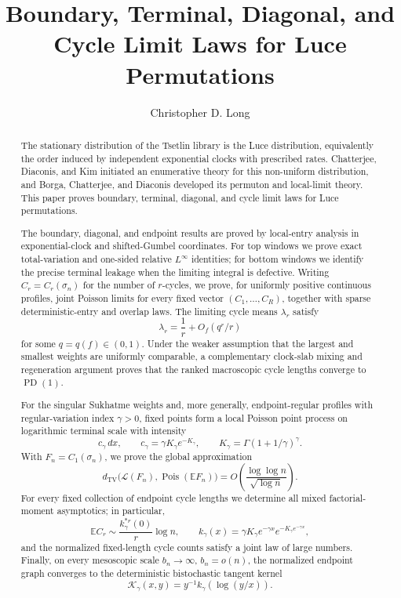 \documentclass[11pt]{article}
\title{Boundary, Terminal, Diagonal, and Cycle Limit Laws for Luce Permutations}
\author{Christopher D. Long}
\date{}
\theoremstyle{remark}
\newcommand{\Ee}{\mathbb E}
\newcommand{\dd}{\,d}
\begin{document}
\maketitle

\begin{abstract}
The stationary distribution of the Tsetlin library is the Luce distribution,
equivalently the order induced by independent exponential clocks with prescribed
rates.  Chatterjee, Diaconis, and Kim initiated an enumerative theory for this
non-uniform distribution, and Borga, Chatterjee, and Diaconis developed its
permuton and local-limit theory.  This paper proves boundary, terminal,
diagonal, and cycle limit laws for Luce permutations.

The boundary, diagonal, and endpoint results are proved by local-entry analysis
in exponential-clock and shifted-Gumbel coordinates.  For top windows we prove
exact total-variation and one-sided relative $L^\infty$ identities; for bottom
windows we identify the precise terminal leakage when the limiting integral is
defective.  Writing $C_r=C_r(\sigma_n)$ for the number of $r$-cycles, we prove,
for uniformly positive continuous profiles, joint Poisson limits for every
fixed vector $(C_1,\ldots,C_R)$, together with sparse deterministic-entry and
overlap laws.  The limiting cycle means $\lambda_r$ satisfy
\[
        \lambda_r=\frac1r+O_f(q^r/r)
\]
for some $q=q(f)\in(0,1)$.  Under the weaker assumption that the largest and
smallest weights are uniformly comparable, a complementary clock-slab mixing
and regeneration argument proves that the ranked macroscopic cycle lengths
converge to $\operatorname{PD}(1)$.

For the singular Sukhatme weights and, more generally, endpoint-regular profiles
with regular-variation index $\gamma>0$, fixed points form a local Poisson point
process on logarithmic terminal scale with intensity
\[
        c_\gamma\dd x,
        \qquad
        c_\gamma=\gamma K_\gamma e^{-K_\gamma},
        \qquad
        K_\gamma=\Gamma(1+1/\gamma)^\gamma.
\]
With $F_n=C_1(\sigma_n)$, we prove the global approximation
\[
        d_{\mathrm{TV}}\bigl(\mathcal L(F_n),
        \operatorname{Pois}(\Ee F_n)\bigr)
        =O\!\left(\frac{\log\log n}{\sqrt{\log n}}\right).
\]
For every fixed collection of endpoint cycle lengths we determine all mixed
factorial-moment asymptotics; in particular,
\[
        \Ee C_r\sim \frac{k_\gamma^{*r}(0)}r\log n,
        \qquad
        k_\gamma(x)=\gamma K_\gamma e^{-\gamma x}
        e^{-K_\gamma e^{-\gamma x}},
\]
and the normalized fixed-length cycle counts satisfy a joint law of large
numbers.  Finally, on every mesoscopic scale $b_n\to\infty$, $b_n=o(n)$, the
normalized endpoint graph converges to the deterministic bistochastic tangent
kernel
\[
        \mathcal K_\gamma(x,y)
        =y^{-1}k_\gamma(\log(y/x)).
\]
\end{abstract}
\end{document}
